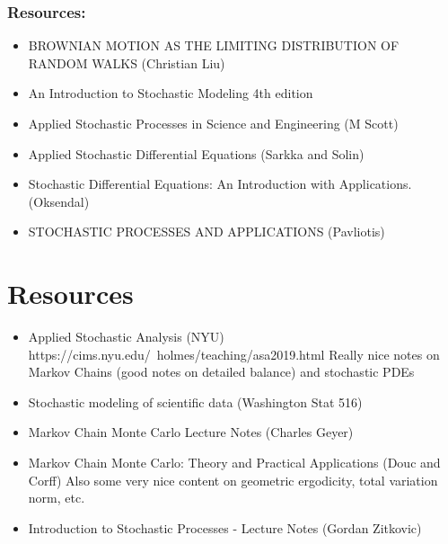 \documentclass[12pt]{article}
\begin{document}
\subsubsection{Resources:}
\begin{itemize}
\item BROWNIAN MOTION AS THE LIMITING DISTRIBUTION OF RANDOM WALKS (Christian Liu)
\item An Introduction to Stochastic Modeling 4th edition 
\item Applied Stochastic Processes in Science and Engineering (M Scott)
\item Applied Stochastic Differential Equations (Sarkka and Solin)
\item Stochastic Differential Equations: An Introduction with Applications. (Oksendal)
\item STOCHASTIC PROCESSES AND APPLICATIONS (Pavliotis)
\end{itemize}


\section{Resources}
\begin{itemize}
\item Applied Stochastic Analysis (NYU)
https://cims.nyu.edu/~holmes/teaching/asa2019.html
Really nice notes on Markov Chains (good notes on detailed balance) and stochastic PDEs
\item Stochastic modeling of scientific data (Washington Stat 516)
\item Markov Chain Monte Carlo Lecture Notes (Charles Geyer)
\item Markov Chain Monte Carlo: Theory and Practical Applications (Douc and Corff)
Also some very nice content on geometric ergodicity, total variation norm, etc.
\item Introduction to Stochastic Processes - Lecture Notes (Gordan Zitkovic)
\end{itemize}
\end{document}
